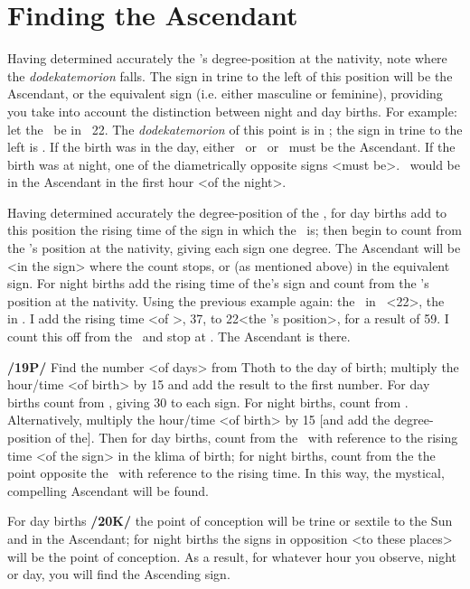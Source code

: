 \section{Finding the Ascendant}
Having determined accurately the \Sun’s degree-position at the nativity, note where the \textsl{dodekatemorion} falls. The sign in trine to the left of this position will be the Ascendant, or the equivalent sign (i.e. either masculine or feminine), providing you take into account the distinction between night and day births. For example: let the \Sun\, be in \Aquarius\, 22\deg. The \textsl{dodekatemorion} of this point is in \Scorpio; the sign in trine to the left is \Pisces. If the birth was in the day, either \Pisces\, or \Taurus\, or \Cancer\, must be the Ascendant. If the birth was at night, one of the diametrically opposite signs <must be>. \Virgo\, would be in the Ascendant in the first hour <of the night>.

Having determined accurately the degree-position of the \Sun, for day births add to this position the rising time of the sign in which the \Sun\, is; then begin to count from the \Moon’s position at the nativity, giving each sign one degree. The Ascendant will be <in the sign> where the count stops, or (as mentioned above) in the equivalent sign. For night births add the rising time of the\Moon’s sign and count from the \Sun’s position at the nativity. Using the previous example again: the \Sun\, in \Aquarius\, <22\deg>, the \Moon\, in
\Scorpio. I add the rising time <of \Scorpio>, 37, to 22\deg <the \Sun’s position>, for a result of 59. I count this off from the \Sun\, and stop at \Virgo. The Ascendant is there.

\textbf{/19P/} Find the number <of days> from Thoth to the day of birth; multiply the hour/time <of birth> by 15 and add the result to the first number. For day births count from \Virgo, giving 30 to each sign. For night births, count from \Pisces.
Alternatively, multiply the hour/time <of birth> by 15 [and add the degree-position of the\Sun]. Then for day births, count from the \Sun\, with reference to the rising time <of the sign> in the klima of birth; for night births, count from the the point opposite the \Sun\, with reference to the rising time. In this way, the mystical, compelling Ascendant will be found. 

For day births \textbf{/20K/} the point of conception will be trine or sextile to the Sun and in the Ascendant; for night births the signs in opposition <to these places> will be the point of conception. As a result, for whatever hour you observe, night or day, you will find the Ascending sign.

